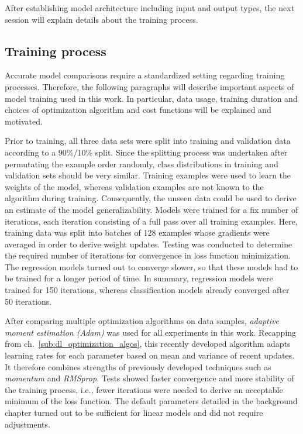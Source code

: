 After establishing model architecture including input and output types, the next
session will explain details about the training process.

\subsection{Training process}
\label{sub:lin_training}

Accurate model comparisons require a standardized setting regarding training
processes.
Therefore, the following paragraphs will describe important aspects of model training
used in this work.
In particular, data usage, training duration and choices of optimization
algorithm and cost functions will be explained and motivated.

Prior to training, all three data sets were split into training and validation
data according to a 90\%/10\% split.
Since the splitting process was undertaken after permutating the example order
randomly, class distributions in training and validation sets should be very
similar.
Training examples were used to learn the weights of the model, whereas validation
examples are not known to the algorithm during training.
Consequently, the unseen data could be used to derive an estimate of the model
generalizability.
Models were trained for a fix number of iterations, each iteration consisting
of a full pass over all training examples.
Here, training data was split into batches of 128 examples whose gradients
were averaged in order to derive weight updates.
Testing was conducted to determine the required number of iterations for
convergence in loss function minimization.
The regression models turned out to converge slower, so that these models
had to be trained for a longer period of time.
In summary, regression models were trained for 150 iterations, whereas classification
models already converged after 50 iterations.

After comparing multiple optimization algorithms on data samples, \textit{adaptive
moment estimation (Adam)} was used for all experiments in this work.
Recapping from ch.~\ref{sub:dl_optimization_algos}, this recently developed
algorithm adapts learning rates for each parameter based on mean and variance of
recent updates.
It therefore combines strengths of previously developed techniques such as
\textit{momentum} and \textit{RMSprop}.
Tests showed faster convergence and more stability of the training process, i.e.,
fewer iterations were needed to derive an acceptable minimum of the loss function.
The default parameters detailed in the background chapter turned out to be sufficient
for linear models and did not require adjustments.

